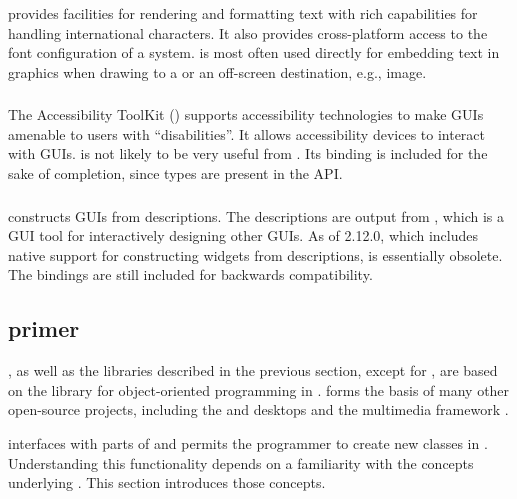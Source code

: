 \documentclass[article,shortnames]{jss}
\begin{document}
 provides facilities for rendering and formatting text with
rich capabilities for handling international characters. It also
provides cross-platform access to the font configuration of a system.
 is most often used directly for embedding text in graphics
when drawing to a  or an off-screen destination,
e.g., image.

\subsubsection[ATK]{} 

The Accessibility ToolKit () supports accessibility
technologies to make GUIs amenable to users with ``disabilities''.  It
allows accessibility devices to interact with 
GUIs.  is not likely to be very useful from . Its
binding is included for the sake of completion, since  types
are present in the  API.

\subsubsection[Libglade]{}

 constructs  GUIs from 
descriptions.
The  descriptions are output from
, which is a GUI tool for interactively designing other
GUIs. 
As of  2.12.0, which includes native support for
constructing widgets from  descriptions, 
is
essentially obsolete. The bindings are still included for backwards
compatibility.

\subsection[GObject primer]{
primer}\label{sec:primer}

, as well as the libraries described in the previous
section, except for , are based on the 
library for object-oriented programming in . 
forms the basis of many other open-source projects, including the
 \citep{GNOME} and  
\citep{xfce} desktops and the  multimedia framework
\citep{gstreamer}.

 interfaces with parts of  and permits the
  programmer to create new  classes in
. Understanding this functionality depends on a
familiarity with the concepts underlying 
. This section introduces those concepts.
\end{document}

